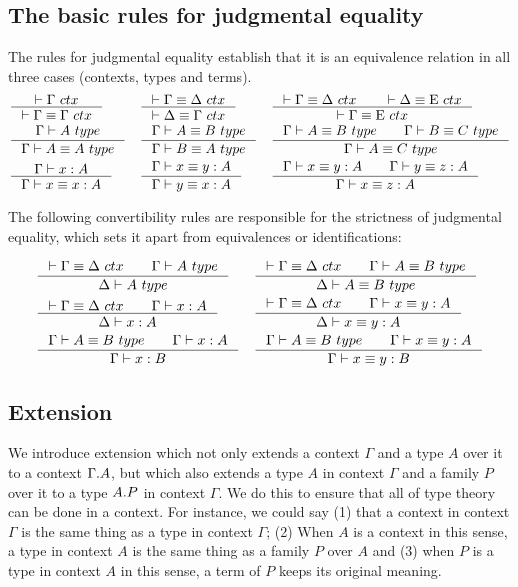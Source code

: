 \subsection{The basic rules for judgmental equality}
The rules for judgmental equality establish that it is an equivalence relation
in all three cases (contexts, types and terms).
\bgroup\small
\begin{align*}
& \inference{\jctx{\Gamma}}{\jctxeq{\Gamma}{\Gamma}} 
& & \inference{\jctxeq{\Gamma}{\Delta}}{\jctxeq{\Delta}{\Gamma}} 
& & \inference{\jctxeq{\Gamma}{\Delta}\qquad\jctxeq{\Delta}{\greek{E}}}{\jctxeq{\Gamma}{\greek{E}}}\\
& \inference{\jtype{\Gamma}{A}}{\jtypeeq{\Gamma}{A}{A}} 
& & \inference{\jtypeeq{\Gamma}{A}{B}}{\jtypeeq{\Gamma}{B}{A}}
& & \inference{\jtypeeq{\Gamma}{A}{B}\qquad\jtypeeq{\Gamma}{B}{C}}{\jtypeeq{\Gamma}{A}{C}}\\
& \inference{\jterm{\Gamma}{A}{x}}{\jtermeq{\Gamma}{A}{x}{x}}
& & \inference{\jtermeq{\Gamma}{A}{x}{y}}{\jtermeq{\Gamma}{A}{y}{x}}
& & \inference{\jtermeq{\Gamma}{A}{x}{y}\qquad\jtermeq{\Gamma}{A}{y}{z}}{\jtermeq{\Gamma}{A}{x}{z}}
\end{align*}
\egroup

The following convertibility rules are responsible for the strictness
of judgmental equality, which sets it apart from equivalences or identifications:

\begin{align*}
& \inference{\jctxeq{\Gamma}{\Delta}\qquad\jtype{\Gamma}{A}}{\jtype{\Delta}{A}}
& & \inference{\jctxeq{\Gamma}{\Delta}\qquad\jtypeeq{\Gamma}{A}{B}}{\jtypeeq{\Delta}{A}{B}}\\
& \inference{\jctxeq{\Gamma}{\Delta}\qquad\jterm{\Gamma}{A}{x}}{\jterm{\Delta}{A}{x}}
& & \inference{\jctxeq{\Gamma}{\Delta}\qquad\jtermeq{\Gamma}{A}{x}{y}}{\jtermeq{\Delta}{A}{x}{y}}\\
& \inference{\jtypeeq{\Gamma}{A}{B}\qquad \jterm{\Gamma}{A}{x}}{\jterm{\Gamma}{B}{x}}
& & \inference{\jtypeeq{\Gamma}{A}{B}\qquad\jtermeq{\Gamma}{A}{x}{y}}{\jtermeq{\Gamma}{B}{x}{y}}
\end{align*}

\subsection{Extension}
We introduce extension which not only extends a context $\Gamma$ and a type
$A$ over it to a context $\ctxext{\Gamma}{A}$, but which also extends a type $A$
in context $\Gamma$ and a family $P$ over it to a type $\ctxext{A}{P}$ in context
$\Gamma$. We do this to ensure that all of type theory can be done in a context.
For instance, we could say (1) that a context in context $\Gamma$ is the same thing
as a type in context $\Gamma$; (2) When $A$ is a context in this sense, a type in
context $A$ is the same thing as a family $P$ over $A$ and (3) when $P$ is a type
in context $A$ in this sense, a term of $P$ keeps its original meaning.


